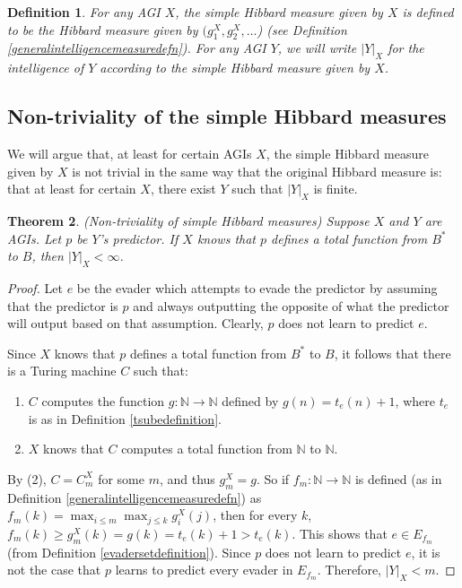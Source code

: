 \documentclass{article}
\newtheorem{theorem}{Theorem}
\newtheorem{definition}[theorem]{Definition}
\begin{document}
\begin{definition}
    For any AGI $X$, the \emph{simple Hibbard measure given by $X$}
    is defined to be the Hibbard measure given by
    $(g^X_1,g^X_2,\ldots$) (see Definition \ref{generalintelligencemeasuredefn}).
    For any AGI $Y$, we will write $|Y|_X$ for the intelligence of $Y$
    according to the simple Hibbard measure given by $X$.
\end{definition}

\subsection{Non-triviality of the simple Hibbard measures}

We will argue that, at least for certain AGIs $X$,
the simple Hibbard measure given by $X$ is
not trivial in the same way that the original Hibbard measure is:
that at least for certain $X$, there exist $Y$ such that
$|Y|_X$ is finite.

\begin{theorem}
\label{simplehibbardnontrivialtheorem}
    (Non-triviality of simple Hibbard measures)
    Suppose $X$ and $Y$ are AGIs. Let $p$ be $Y$'s predictor.
    If $X$ knows that $p$ defines a total function from $B^*$ to $B$,
    then $|Y|_X<\infty$.
\end{theorem}

\begin{proof}
    Let $e$ be the evader which attempts to evade the predictor by assuming
    that the predictor is $p$ and always outputting the opposite of what
    the predictor will output based on that assumption. Clearly, $p$ does
    not learn to predict $e$.

    Since $X$ knows that $p$ defines a total function from $B^*$ to $B$,
    it follows that there is a Turing machine $C$ such that:
    \begin{enumerate}
        \item
        $C$ computes the function $g:\mathbb N\to \mathbb N$ defined by
        $g(n)=t_e(n)+1$, where $t_e$ is as in
        Definition \ref{tsubedefinition}.
        \item
        $X$ knows that $C$ computes a total function from $\mathbb N$ to $\mathbb N$.
    \end{enumerate}
    By (2), $C=C^X_m$ for some $m$, and thus $g^X_m=g$.
    So if $f_m:\mathbb N\to\mathbb N$ is defined
    (as in Definition \ref{generalintelligencemeasuredefn})
    as $f_m(k)=\max_{i\leq m}\max_{j\leq k}g^X_i(j)$,
    then for every $k$, $f_m(k)\geq g^X_m(k)=g(k)=t_e(k)+1>t_e(k)$.
    This shows that $e\in E_{f_m}$ (from Definition \ref{evadersetdefinition}).
    Since $p$ does not learn to predict $e$,
    it is not the case that $p$ learns to predict every evader in $E_{f_m}$.
    Therefore, $|Y|_X<m$.
\end{proof}
\end{document}
